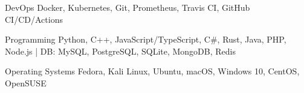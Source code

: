 

\begin{cvskills}

  \cvskill
    {DevOps} %
    {Docker, Kubernetes, Git, Prometheus, Travis CI, GitHub CI/CD/Actions} %

  \cvskill
    {Programming} %
    {Python, C++, JavaScript/TypeScript, C\#, Rust, Java, PHP, Node.js | DB: MySQL, PostgreSQL, SQLite, MongoDB, Redis} %
    
    
  \cvskill
    {Operating Systems} %
    {Fedora, Kali Linux, Ubuntu, macOS, Windows 10, CentOS, OpenSUSE} %
%

\end{cvskills}
